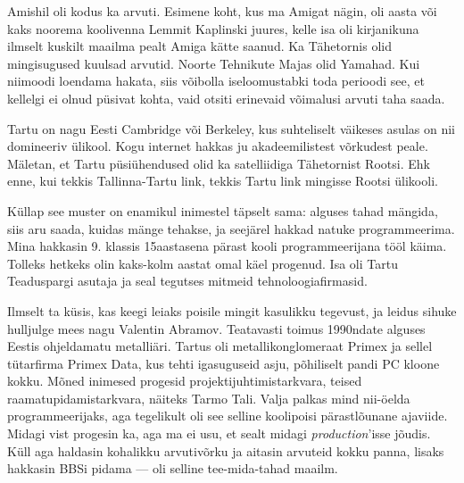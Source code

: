 Amishil oli kodus ka arvuti. Esimene koht, kus ma Amigat nägin, oli aasta või kaks noorema 
koolivenna Lemmit Kaplinski juures, kelle isa oli
kirjanikuna ilmselt kuskilt maailma pealt Amiga kätte saanud. Ka 
Tähetornis olid mingisugused kuulsad arvutid. 
Noorte Tehnikute Majas olid 
Yamahad. Kui niimoodi loendama hakata, siis võibolla 
iseloomustabki toda perioodi see, et kellelgi ei olnud püsivat kohta, vaid 
otsiti erinevaid võimalusi arvuti taha saada.


Tartu on nagu Eesti Cambridge või Berkeley, kus 
suhteliselt väikeses asulas on nii domineeriv ülikool. Kogu internet 
hakkas ju akadeemilistest võrkudest peale. Mäletan, et Tartu püsiühendused 
olid ka satelliidiga Tähetornist Rootsi. 
Ehk enne, kui tekkis Tallinna-Tartu link, tekkis Tartu link mingisse Rootsi 
ülikooli. 


Küllap see muster on enamikul inimestel täpselt sama: alguses 
tahad mängida, siis aru saada, kuidas mänge tehakse, ja seejärel hakkad natuke 
programmeerima. Mina hakkasin 9. klassis 15aastasena pärast kooli 
programmeerijana tööl käima. Tolleks hetkeks olin 
kaks-kolm aastat omal käel progenud. Isa oli Tartu 
Teaduspargi asutaja ja seal tegutses 
mitmeid tehnoloogiafirmasid. 

Ilmselt ta küsis, kas keegi leiaks poisile mingit kasulikku 
tegevust, ja leidus sihuke hulljulge mees nagu Valentin 
Abramov. Teatavasti toimus 1990ndate alguses 
Eestis ohjeldamatu metalliäri. Tartus oli metallikonglomeraat 
Primex ja sellel tütarfirma Primex Data, kus 
tehti igasuguseid asju, põhiliselt pandi PC kloone kokku. Mõned inimesed progesid projektijuhtimistarkvara, teised
raamatupidamistarkvara, näiteks Tarmo 
Tali. Valja palkas mind nii-öelda programmeerijaks, 
aga tegelikult oli see selline koolipoisi pärastlõunane ajaviide. Midagi 
vist progesin ka, aga ma ei usu, et sealt midagi \emph{production}'isse 
jõudis. Küll aga haldasin kohalikku arvutivõrku ja aitasin arvuteid kokku 
panna, lisaks hakkasin BBSi pidama --- oli selline tee-mida-tahad maailm.



